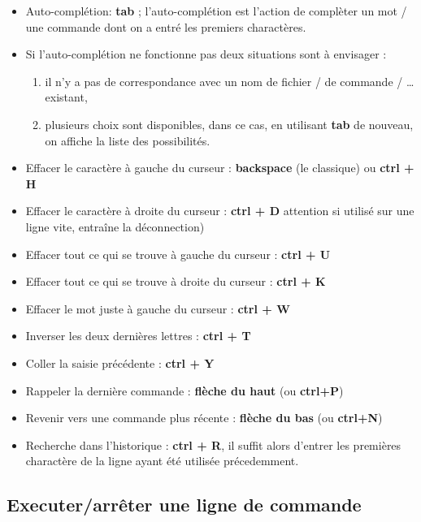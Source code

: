 \begin{itemize}
\tightlist
\item
  Auto-complétion: \textbf{tab} ; l'auto-complétion est l'action de
  complèter un mot / une commande dont on a entré les premiers
  charactères.
\item
  Si l'auto-complétion ne fonctionne pas deux situations sont à
  envisager :

  \begin{enumerate}
  \def\labelenumi{\arabic{enumi}.}
  \tightlist
  \item
    il n'y a pas de correspondance avec un nom de fichier / de commande
    / \ldots{} existant,
  \item
    plusieurs choix sont disponibles, dans ce cas, en utilisant
    \textbf{tab} de nouveau, on affiche la liste des possibilités.
  \end{enumerate}
\item
  Effacer le caractère à gauche du curseur : \textbf{backspace} (le
  classique) ou \textbf{ctrl + H}
\item
  Effacer le caractère à droite du curseur : \textbf{ctrl + D} attention
  si utilisé sur une ligne vite, entraîne la déconnection)
\item
  Effacer tout ce qui se trouve à gauche du curseur : \textbf{ctrl + U}
\item
  Effacer tout ce qui se trouve à droite du curseur : \textbf{ctrl + K}
\item
  Effacer le mot juste à gauche du curseur : \textbf{ctrl + W}
\item
  Inverser les deux dernières lettres : \textbf{ctrl + T}
\item
  Coller la saisie précédente : \textbf{ctrl + Y}
\item
  Rappeler la dernière commande : \textbf{flèche du haut} (ou
  \textbf{ctrl+P})
\item
  Revenir vers une commande plus récente : \textbf{flèche du bas} (ou
  \textbf{ctrl+N})
\item
  Recherche dans l'historique : \textbf{ctrl + R}, il suffit alors
  d'entrer les premières charactère de la ligne ayant été utilisée
  précedemment.
\end{itemize}

\subsection{Executer/arrêter une ligne de
commande}\label{executerarruxeater-une-ligne-de-commande}

